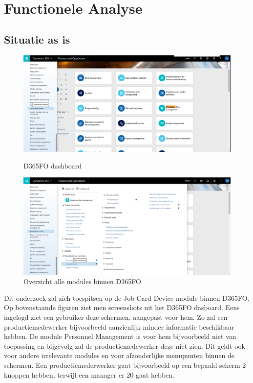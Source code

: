 
\chapter{Functionele Analyse}
\label{ch:funcioneleanalyse}


\section{Situatie as is}
\begin{figure}[h]
\centering
\begin{minipage}[t]{0.49\textwidth}   
    \includegraphics*[width=1\textwidth]{img/d365productionControl1}
    \caption{D365FO dashboard}
\end{minipage}
\begin{minipage}[t]{0.49\textwidth}
    \includegraphics*[width=1\textwidth]{img/d365productionControl2}
    \caption{Overzicht alle modules binnen D365FO}
\end{minipage}
\end{figure}
    
Dit onderzoek zal zich toespitsen op de Job Card Device module binnen D365FO. Op bovenstaande figuren ziet men screenshots uit het D365FO dasboard. Eens ingelogd ziet een gebruiker deze schermen, aangepast voor hem. Zo zal een productiemedewerker bijvoorbeeld aanzienlijk minder informatie beschikbaar hebben. De module Personnel Management is voor hem bijvoorbeeld niet van toepassing en bijgevolg zal de productiemedewerker deze niet zien. Dit geldt ook voor andere irrelevante modules en voor afzonderlijke menupunten binnen de schermen. Een productiemederwerker gaat bijvoorbeeld op een bepaald scherm 2 knoppen hebben, terwijl een manager er 20 gaat hebben.


